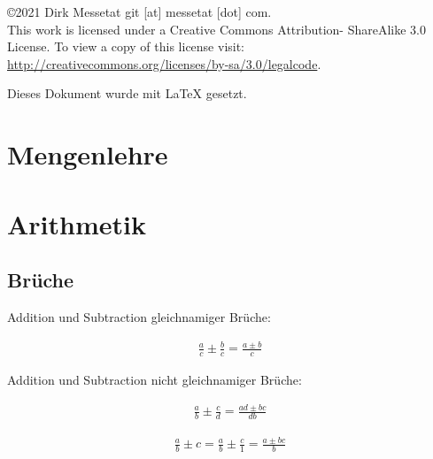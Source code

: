 \documentclass[12pt,a4paper,fleqn,twoside,pdf,final]{article}
\begin{document}
\maketitle
\thispagestyle{empty}


\vfill
 

\begin{flushright}
    \copyright  2021 Dirk Messetat git [at] messetat [dot] com. \\
    This work is licensed under a Creative Commons Attribution- ShareAlike 3.0 License.
    To view a copy of this license visit:
     \url{http://creativecommons.org/licenses/by-sa/3.0/legalcode}.
\end{flushright}

\pagebreak



\setcounter{tocdepth}{1}
\tableofcontents
\thispagestyle{empty}


\vfill

\begin{center}
\small{Dieses Dokument wurde mit \LaTeX{} gesetzt.}
\end{center}

%
\newpage
%

\clearpage
{} 

\section{Mengenlehre}
\section{Arithmetik}
\subsection{Brüche}

Addition und Subtraction gleichnamiger Brüche:

\begin{align*}
  \frac{a}{c} \pm \frac{b}{c} =  \frac{a \pm b}{c} 
\end{align*}

Addition und Subtraction nicht gleichnamiger Brüche:

\begin{align*}
\frac{a}{b} \pm \frac{c}{d} = \frac{ad \pm bc}{db} 
\end{align*}

\begin{align*}
\frac{a}{b} \pm c = \frac{a}{b} \pm \frac{c}{1} = \frac{a \pm bc}{b} 
\end{align*}
\end{document}
